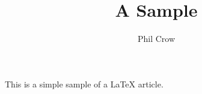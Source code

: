 \documentclass{article}
\title{A Sample}
\author{Phil Crow}
\begin{document}
\maketitle

This is a simple sample of a LaTeX article.
\end{document}
